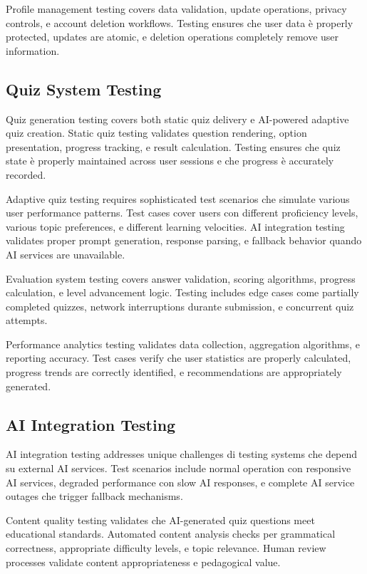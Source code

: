 \documentclass[12pt,a4paper]{article}
\begin{document}
Profile management testing covers data validation, update operations, privacy controls, e account deletion workflows. Testing ensures che user data è properly protected, updates are atomic, e deletion operations completely remove user information.

\subsection{Quiz System Testing}

Quiz generation testing covers both static quiz delivery e AI-powered adaptive quiz creation. Static quiz testing validates question rendering, option presentation, progress tracking, e result calculation. Testing ensures che quiz state è properly maintained across user sessions e che progress è accurately recorded.

Adaptive quiz testing requires sophisticated test scenarios che simulate various user performance patterns. Test cases cover users con different proficiency levels, various topic preferences, e different learning velocities. AI integration testing validates proper prompt generation, response parsing, e fallback behavior quando AI services are unavailable.

Evaluation system testing covers answer validation, scoring algorithms, progress calculation, e level advancement logic. Testing includes edge cases come partially completed quizzes, network interruptions durante submission, e concurrent quiz attempts.

Performance analytics testing validates data collection, aggregation algorithms, e reporting accuracy. Test cases verify che user statistics are properly calculated, progress trends are correctly identified, e recommendations are appropriately generated.

\subsection{AI Integration Testing}

AI integration testing addresses unique challenges di testing systems che depend su external AI services. Test scenarios include normal operation con responsive AI services, degraded performance con slow AI responses, e complete AI service outages che trigger fallback mechanisms.

Content quality testing validates che AI-generated quiz questions meet educational standards. Automated content analysis checks per grammatical correctness, appropriate difficulty levels, e topic relevance. Human review processes validate content appropriateness e pedagogical value.
\end{document}
